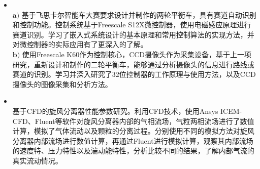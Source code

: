 \documentclass[zh]{resume}
\begin{document}
\begin{itemize}
	\item {} %
	\quad {}\\
	$\mathbf{a)}$ 基于飞思卡尔智能车大赛要求设计并制作的两轮平衡车，具有赛道自动识别和控制功能。控制系统基于Freescale S12X微控制器，使用电磁感应原理进行赛道识别。学习了嵌入式系统设计的基本原理和常用控制算法的实现方法，并对微控制器的实际应用有了更深入的了解。\\
	$\mathbf{b)}$ 使用Freescale K60作为控制核心，CCD摄像头作为采集设备，基于上一项研究，重新设计和制作的二轮平衡车，能够通过分析摄像头的信息进行路线或赛道的识别。学习并深入研究了32位控制器的工作原理与使用方法，以及CCD摄像头的图像采集和分析方法。
	
	\item {}
	\quad {}\\
    基于CFD的旋风分离器性能参数研究。利用CFD技术，使用Ansys ICEM-CFD、Fluent等软件对旋风分离器内部的气相流场，气粒两相流场进行了数值计算，模拟了气体流动以及颗粒的分离过程。分别使用不同的模拟方法对旋风分离器内部流场进行数值计算，再通过Fluent进行模拟计算，观察其内部流场的速度特、压力特性以及湍动能特性，分析比较不同的结果，了解内部气流的真实流动情况。
	
	
	
	
\end{itemize}
\end{document}
